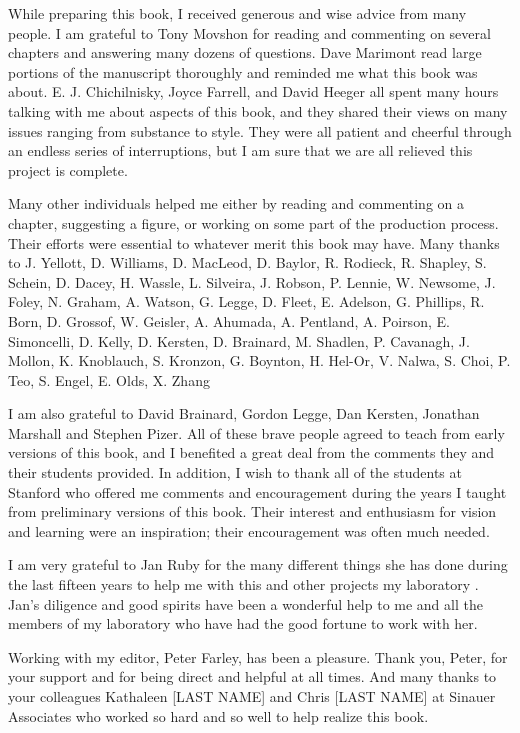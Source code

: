 
\doublespace


While preparing this book, I received generous and wise advice from
many people.  I am grateful to Tony Movshon for reading and commenting
on several chapters and answering many dozens of questions.  Dave
Marimont read large portions of the manuscript thoroughly and reminded
me what this book was about.  E. J. Chichilnisky, Joyce Farrell, and
David Heeger all spent many hours talking with me about aspects of
this book, and they shared their views on many issues ranging from
substance to style.  They were all patient and cheerful through an
endless series of interruptions, but I am sure that we are all relieved
this project is complete.

Many other individuals helped me either by reading and commenting on a
chapter, suggesting a figure, or working on some part of the
production process.  Their efforts were essential to whatever merit
this book may have.  Many thanks to J. Yellott, D. Williams,
D. MacLeod, D. Baylor, R. Rodieck, R. Shapley, S. Schein, D. Dacey,
H. Wassle, L. Silveira, J. Robson, P. Lennie, W. Newsome, J. Foley,
N. Graham, A. Watson, G. Legge, D. Fleet, E. Adelson, G. Phillips,
R. Born, D. Grossof, W. Geisler, A. Ahumada, A. Pentland, A. Poirson,
E. Simoncelli, D. Kelly, D. Kersten, D. Brainard, M. Shadlen,
P. Cavanagh, J. Mollon, K. Knoblauch, S. Kronzon, G. Boynton,
H. Hel-Or, V. Nalwa, S. Choi, P. Teo, S. Engel, E. Olds, X. Zhang

I am also grateful to David Brainard, Gordon Legge, Dan Kersten,
Jonathan Marshall and Stephen Pizer.  All of these brave people agreed
to teach from early versions of this book, and I benefited a great
deal from the comments they and their students provided.  In addition,
I wish to thank all of the students at Stanford who offered me
comments and encouragement during the years I taught from preliminary
versions of this book.  Their interest and enthusiasm for vision and
learning were an inspiration; their encouragement was often much
needed.

I am very grateful to Jan Ruby for the many different things she
has done during the last fifteen years to help me with this and 
other projects my laboratory .  Jan's diligence and good spirits
have been a wonderful help to me and all the members of my laboratory
who have had the good fortune to work with her.

Working with my editor, Peter Farley, has been a pleasure.  Thank you,
Peter, for your support and for being direct and helpful at all times.
And many thanks to your colleagues Kathaleen [LAST NAME] and Chris
[LAST NAME] at Sinauer Associates who worked so hard and so well to
help realize this book.

